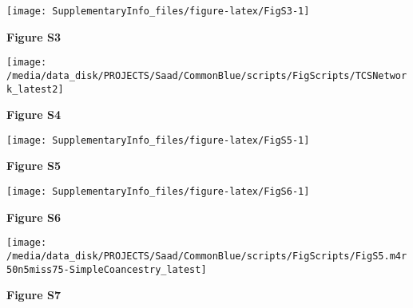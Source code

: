 \documentclass[12pt,]{article}
\begin{document}
\begin{center}\texttt{[image: SupplementaryInfo\_files/figure-latex/FigS3-1]} \end{center}

\textbf{Figure S3}

\pagebreak

\begin{center}\texttt{[image: /media/data\_disk/PROJECTS/Saad/CommonBlue/scripts/FigScripts/TCSNetwork\_latest2]} \end{center}

\textbf{Figure S4}

\begin{center}\texttt{[image: SupplementaryInfo\_files/figure-latex/FigS5-1]} \end{center}

\textbf{Figure S5}

\begin{center}\texttt{[image: SupplementaryInfo\_files/figure-latex/FigS6-1]} \end{center}

\textbf{Figure S6}

\begin{center}\texttt{[image: /media/data\_disk/PROJECTS/Saad/CommonBlue/scripts/FigScripts/FigS5.m4r50n5miss75-SimpleCoancestry\_latest]} \end{center}

\textbf{Figure S7}
\end{document}
